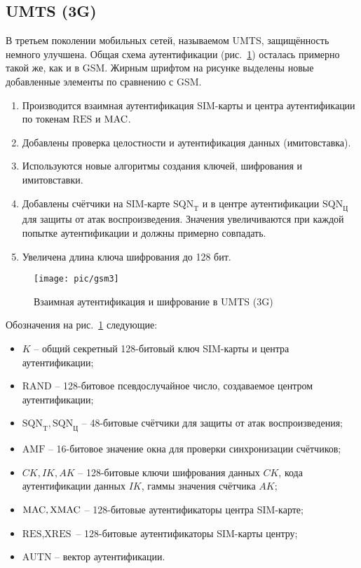 \subsection{UMTS (3G)}

В третьем поколении мобильных сетей, называемом UMTS, защищённость немного улучшена. Общая схема аутентификации (рис.~\ref{fig:gsm3}) осталась примерно такой же, как и в GSM. Жирным шрифтом на рисунке выделены новые добавленные элементы по сравнению с GSM.
\begin{enumerate}
    \item Производится взаимная аутентификация SIM-карты и центра аутентификации по токенам $\textrm{RES}$ и $\textrm{MAC}$.
    \item Добавлены проверка целостности и аутентификация данных (имитовставка).
    \item Используются новые алгоритмы создания ключей, шифрования и имитовставки.
    \item Добавлены счётчики на SIM-карте $\textrm{SQN}_{\textrm{T}}$ и в центре аутентификации $\textrm{SQN}_{\textrm{Ц}}$ для защиты от атак воспроизведения. Значения увеличиваются при каждой попытке аутентификации и должны примерно совпадать.
    \item Увеличена длина ключа шифрования до 128 бит.
\end{enumerate}

\begin{figure}[!ht]
	\centering
	\texttt{[image: pic/gsm3]}
	\caption{Взаимная аутентификация и шифрование в UMTS (3G)\label{fig:gsm3}}
\end{figure}

Обозначения на рис.~\ref{fig:gsm3} следующие:
\begin{itemize}
    \item $K$ -- общий секретный 128-битовый ключ SIM-карты и центра аутентификации;
    \item $\textrm{RAND}$ -- 128-битовое псевдослучайное число, создаваемое центром аутентификации;
    \item $\textrm{SQN}_{\textrm{T}}, \textrm{SQN}_{\textrm{Ц}}$ -- 48-битовые счётчики для защиты от атак воспроизведения;
    \item $\textrm{AMF}$ -- 16-битовое значение окна для проверки синхронизации счётчиков;
    \item $CK, IK, AK$ -- 128-битовые ключи шифрования данных $CK$, кода аутентификации данных $IK$, гаммы значения счётчика $AK$;
    \item $\textrm{MAC}, \textrm{XMAC}$ -- 128-битовые аутентификаторы центра SIM-карте;
    \item $\textrm{RES}, \textrm{XRES}$ -- 128-битовые аутентификаторы SIM-карты центру;
    \item $\textrm{AUTN}$ -- вектор аутентификации.
\end{itemize}

